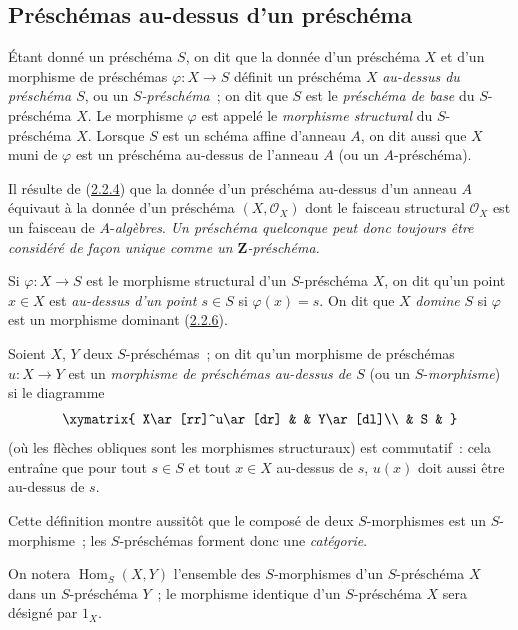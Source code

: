 \subsection{Préschémas au-dessus d'un préschéma}
\label{subsection:I.2.5-fr}

\begin{definition}[2.5.1]
\label{I.2.5.1-fr}
Étant donné un préschéma $S$, on dit que la donnée d'un préschéma $X$ et d'un
morphisme de préschémas $\varphi:X\to S$ définit un préschéma $X$ \emph{au-dessus
du préschéma $S$}, ou un \emph{$S$-préschéma}~; on dit que $S$ est le
\emph{préschéma de base} du $S$-préschéma $X$. Le morphisme $\varphi$ est appelé
le \emph{morphisme structural} du $S$-préschéma $X$. Lorsque $S$ est un schéma
affine d'anneau $A$, on dit aussi que $X$ muni de $\varphi$ est un préschéma
au-dessus de l'anneau $A$ (ou un $A$-préschéma).
\end{definition}

Il résulte de (\hyperref[I.2.2.4-fr]{2.2.4}) que la donnée d'un préschéma
au-dessus d'un anneau $A$ équivaut à la donnée d'un préschéma
$(X,\mathscr{O}_X)$ dont le faisceau structural $\mathscr{O}_X$ est un faisceau
de $A$-\emph{algèbres}. \emph{Un préschéma quelconque peut donc toujours être
considéré de façon unique comme un $\mathbf{Z}$-préschéma.}

Si $\varphi:X\to S$ est le morphisme structural d'un $S$-préschéma $X$, on dit
qu'un point $x\in X$ est \emph{au-dessus d'un point $s\in S$} si
$\varphi(x)=s$. On dit que $X$ \emph{domine} $S$ si $\varphi$ est un morphisme
dominant (\hyperref[I.2.2.6-fr]{2.2.6}).

\begin{env}[2.5.2]
\label{I.2.5.2-fr}
Soient $X$, $Y$ deux $S$-préschémas~; on dit qu'un morphisme de préschémas
$u:X\to Y$ est un \emph{morphisme de préschémas au-dessus de $S$} (ou un
$S$-\emph{morphisme}) si le diagramme
\label{I.2.5.2.diagram-fr}
\[
  \xymatrix{
    X\ar[rr]^u\ar[dr] & & Y\ar[dl]\\
    & S &
  }
\]
(où les flèches obliques sont les morphismes structuraux) est commutatif~:
cela entraîne que pour tout $s\in S$ et tout $x\in X$ au-dessus de $s$, $u(x)$
doit aussi être au-dessus de $s$.
\end{env}

Cette définition montre aussitôt que le composé de deux $S$-morphismes est un
$S$-morphisme~; les $S$-préschémas forment donc une \emph{catégorie}.

On notera $\operatorname{Hom}_S(X,Y)$ l'ensemble des $S$-morphismes d'un
$S$-préschéma $X$ dans un $S$-préschéma $Y$~; le morphisme identique d'un
$S$-préschéma $X$ sera désigné par $1_X$.

